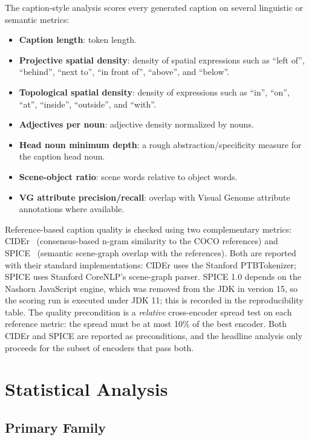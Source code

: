 \documentclass[11pt]{article}
\begin{document}
The caption-style analysis scores every generated caption on several linguistic
or semantic metrics:

\begin{itemize}
  \item \textbf{Caption length}: token length.
  \item \textbf{Projective spatial density}: density of spatial expressions
  such as ``left of'', ``behind'', ``next to'', ``in front of'', ``above'', and
  ``below''.
  \item \textbf{Topological spatial density}: density of expressions such as
  ``in'', ``on'', ``at'', ``inside'', ``outside'', and ``with''.
  \item \textbf{Adjectives per noun}: adjective density normalized by nouns.
  \item \textbf{Head noun minimum depth}: a rough abstraction/specificity
  measure for the caption head noun.
  \item \textbf{Scene-object ratio}: scene words relative to object words.
  \item \textbf{VG attribute precision/recall}: overlap with Visual Genome
  attribute annotations where available.
\end{itemize}

Reference-based caption quality is checked using two complementary metrics:
CIDEr~\cite{vedantam2015cider} (consensus-based n-gram similarity to the COCO
references) and SPICE~\cite{anderson2016spice} (semantic scene-graph overlap
with the references). Both are reported with
their standard implementations: CIDEr uses the Stanford PTBTokenizer; SPICE
uses Stanford CoreNLP's scene-graph parser. SPICE 1.0 depends on the Nashorn
JavaScript engine, which was removed from the JDK in version 15, so the
scoring run is executed under JDK 11; this is recorded in the reproducibility
table. The quality precondition is a \emph{relative} cross-encoder spread
test on each reference metric: the spread must be at most 10\% of the best
encoder. Both CIDEr and SPICE are reported as preconditions, and the
headline analysis only proceeds for the subset of encoders that pass both.

\section{Statistical Analysis}

\subsection{Primary Family}
\end{document}
